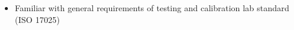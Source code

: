 \documentclass[a4paper,10pt]{article} %
\begin{document}
\begin{itemize}
\begin{itemize}
	 	 \item 
	 	 Familiar with general requirements of testing and calibration lab standard  (ISO 17025)
	 
\end{itemize}
%					
	\end{itemize}
\color{blue}
\end{document}
